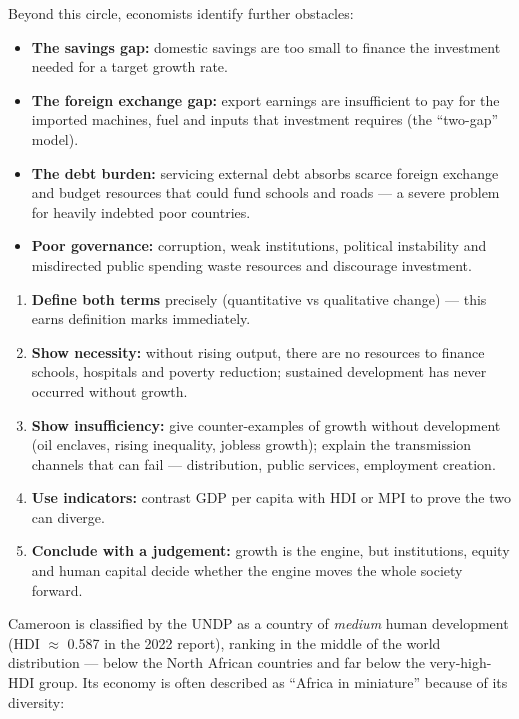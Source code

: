 \documentclass[11pt]{article}
\newcounter{popsec}
\newcounter{popsub}
\newcommand{\courssub}[1]{%
  \stepcounter{popsub}%
  \par\vspace{9pt}\noindent{\popxbold\fontsize{11.5}{13}\selectfont\color{popink}{\color{poporange}\thepopsec.\thepopsub}\hspace{6pt}#1}\par\nopagebreak\vspace{4pt}
}
\begin{document}
Beyond this circle, economists identify further obstacles:

\begin{itemize}
\item \textbf{The savings gap:} domestic savings are too small to finance the investment needed for a target growth rate.
\item \textbf{The foreign exchange gap:} export earnings are insufficient to pay for the imported machines, fuel and inputs that investment requires (the ``two-gap'' model).
\item \textbf{The debt burden:} servicing external debt absorbs scarce foreign exchange and budget resources that could fund schools and roads — a severe problem for heavily indebted poor countries.
\item \textbf{Poor governance:} corruption, weak institutions, political instability and misdirected public spending waste resources and discourage investment.
\end{itemize}

\begin{methode}
\begin{enumerate}
\item \textbf{Define both terms} precisely (quantitative vs qualitative change) — this earns definition marks immediately.
\item \textbf{Show necessity:} without rising output, there are no resources to finance schools, hospitals and poverty reduction; sustained development has never occurred without growth.
\item \textbf{Show insufficiency:} give counter-examples of growth without development (oil enclaves, rising inequality, jobless growth); explain the transmission channels that can fail — distribution, public services, employment creation.
\item \textbf{Use indicators:} contrast GDP per capita with HDI or MPI to prove the two can diverge.
\item \textbf{Conclude with a judgement:} growth is the engine, but institutions, equity and human capital decide whether the engine moves the whole society forward.
\end{enumerate}
\end{methode}

\courssub{Cameroon's Development Profile}

Cameroon is classified by the UNDP as a country of \emph{medium} human development (HDI $\approx$ 0.587 in the 2022 report), ranking in the middle of the world distribution — below the North African countries and far below the very-high-HDI group. Its economy is often described as ``Africa in miniature'' because of its diversity:
\end{document}
